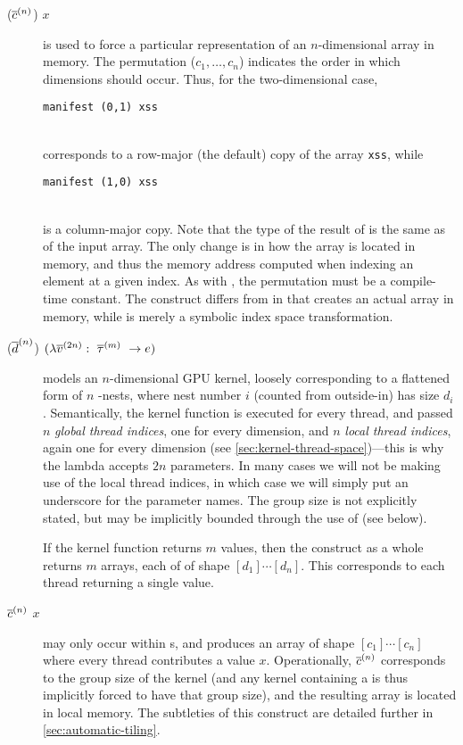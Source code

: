 \begin{description}
\item[ ($\nseq{c}{n}$) $x$] is used to force a particular
  representation of an $n$-dimensional array in memory.  The
  permutation ($c_{1}, \ldots, c_{n}$) indicates the order in
  which dimensions should occur.  Thus, for the two-dimensional case,\\
  \centerline{\mbox{\lstinline{manifest (0,1) xss}}}\\
  corresponds to a row-major
  (the default) copy of the array \lstinline{xss}, while\\
  \centerline{\mbox{\lstinline{manifest (1,0) xss}}}\\
  is a column-major copy.  Note that the type of the result of
   is the same as of the input array.  The only change is
  in how the array is located in memory, and thus the memory address
  computed when indexing an element at a given index.  As with
  , the permutation must be a compile-time constant.
  The  construct differs from  in that
   creates an actual array in memory, while
   is merely a symbolic index space transformation.
\item[ ($\nseq{d}{n}$)
  $(\Fn{\nseq{\tau}{m}}{\nseq{v}{2n}}{e})$] models an $n$-dimensional
  GPU kernel, loosely corresponding to a flattened form of $n$
  -nests, where nest number $i$ (counted from outside-in) has
  size $d_{i}$.  Semantically, the kernel function is executed for
  every thread, and passed $n$ \textit{global thread indices}, one for
  every dimension, and $n$ \textit{local thread indices}, again one
  for every dimension (see \cref{sec:kernel-thread-space})---this is
  why the lambda accepts $2n$ parameters.  In many cases we will not
  be making use of the local thread indices, in which case we will
  simply put an underscore for the parameter names.  The group size is
  not explicitly stated, but may be implicitly bounded through the use
  of  (see below).

  If the kernel function returns $m$ values, then the 
  construct as a whole returns $m$ arrays, each of of shape
  $[d_{1}]\cdots[d_{n}]$.  This corresponds to each thread returning a
  single value.
\item[ $\nseq{c}{n}$ $x$] may only occur within
  s, and produces an array of shape $[c_{1}]\cdots[c_{n}]$
  where every thread contributes a value $x$.  Operationally,
  $\nseq{c}{n}$ corresponds to the group size of the kernel (and any
  kernel containing a  is thus implicitly forced to have
  that group size), and the resulting array is located in local
  memory.  The subtleties of this construct are detailed further in
  \cref{sec:automatic-tiling}.
\end{description}

